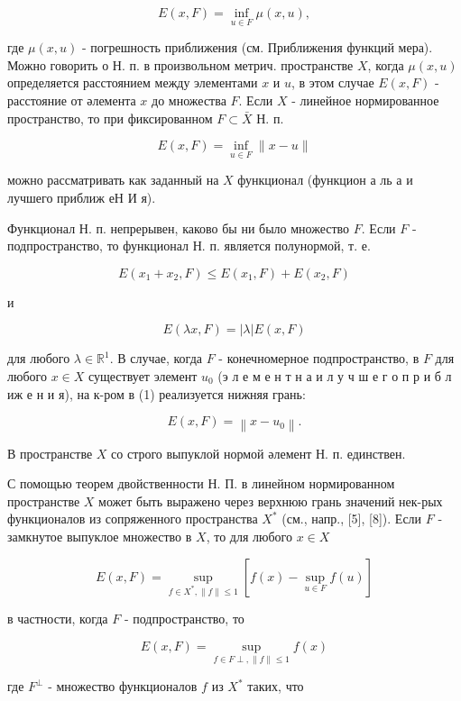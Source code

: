 \documentclass[10pt]{article}
\begin{document}
\[

E(x, F)=\inf _{u \in F} \mu(x, u),

\]



где $\mu(x, u)$ - погрешность приближения (см. Приближения функций мера). Можно говорить о Н. п. в произвольном метрич. пространстве $X$, когда $\mu(x, u)$ определяется расстоянием между элементами $x$ и $u$, в этом случае $E(x, F)$ - расстояние от әлемента $x$ до множества $F$. Если $X$ - линейное нормированное пространство, то при фиксированном $F \subset \bar{X}$ Н. п.



\[

E(x, F)=\inf _{u \in F}\|x-u\|

\]



можно рассматривать как заданный на $X$ функционал (функцион а ль а и лучшего приближ еН И я).



Функционал Н. п. непрерывен, каково бы ни было множество $F$. Если $F$ - подпространство, то функционал Н. п. является полунормой, т. е.



\[

E\left(x_{1}+x_{2}, F\right) \leqslant E\left(x_{1}, F\right)+E\left(x_{2}, F\right)

\]



и



\[

E(\lambda x, F)=|\lambda| E(x, F)

\]



для любого $\lambda \in \mathbb{R}^{1}$. В случае, когда $F$ - конечномерное подпространство, в $F$ для любого $x \in X$ существует элемент $u_{0}$ (э л е м е н т н а и л у ч ш е г о п р и б л иж е н и я), на к-ром в (1) реализуется нижняя грань:



\[

E(x, F)=\left\|x-u_{0}\right\| .

\]



В пространстве $X$ со строго выпуклой нормой әлемент Н. п. единствен.



С помощью теорем двойственности Н. П. в линейном нормированном пространстве $X$ может быть выражено через верхнюю грань значений нек-рых функционалов из сопряженного пространства $X^{*}$ (см., напр., [5], [8]). Если $F$ - замкнутое выпуклое множество в $X$, то для любого $x \in X$



\[

E(x, F)=\sup _{f \in X^{*},\|f\| \leqslant 1}\left[f(x)-\sup _{u \in F} f(u)\right]

\]



в частности, когда $F$ - подпространство, то



\[

E(x, F)=\sup _{f \in F \perp,\|f\| \leqslant 1} f(x)

\]



где $F^{\perp}$ - множество функционалов $f$ из $X^{*}$ таких, что
\end{document}
